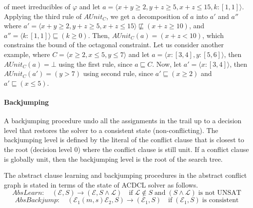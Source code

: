 of meet irreducibles of $\varphi$ and let $a= \langle x+y \geq 2, y+z \geq 5,
x+z \leq 15, k:[1,1] \rangle$.  Applying the third rule of $AUnit_C$, we get a 
decomposition of $a$ into $a'$ and $a''$ where 
$a'= \langle x+y \geq 2, y+z \geq 5, x+z \leq 15 \rangle \not\sqsubseteq (x+z \geq 10)$, and 
$a''= \langle k:[1,1] \rangle \sqsubseteq (k \geq 0)$.  Then, $AUnit_C(a) = (x+z < 10)$, 
which constrains the bound of the octagonal constraint.  
Let us consider another example, where $C = \langle x \geq 2, x \leq 5, y \leq 7 \rangle$
and let $a = \langle x:[3,4], y:[5,6] \rangle$, then $AUnit_C(a) = \bot$ using
the first rule, since $a \sqsubseteq C$.  Now, let $a' = \langle x:[3,4] \rangle$, 
then $AUnit_C(a') = (y > 7)$ using second rule, since $a' \sqsubseteq (x \geq 2)$
and $a' \sqsubseteq (x \leq 5)$.
 
\paragraph {\textbf{Backjumping}}
A backjumping procedure undo all the assignments in the trail up to 
a decision level that restores the solver to a consistent state 
(non-conflicting).  The backjumping level is defined by the literal 
of the conflict clause that is closest to the root (decision level 0) 
where the conflict clause is still unit. If a conflict clause is 
globally unit, then the backjumping level is the root of the search tree.

The abstract clause learning and backjumping procedures in the abstract 
conflict graph is stated in terms of the state of ACDCL solver as follows. 
\[AbsLearn: \quad  (\mathcal{E},S) \rightarrow (\mathcal{E},S \wedge
\mathcal{L}) \quad \text{if} \; \mathcal{L} \notin S \; \textrm{and}
\; (S \wedge \mathcal{L}) \; \text{is not UNSAT} \]
\[AbsBackjump: \quad (\mathcal{E}_1(m,s)\mathcal{E}_2,S) \rightarrow
(\mathcal{E}_1,S) \quad \text{if} \; (\mathcal{E}_1,S) \; \text{is
consistent} \]   

